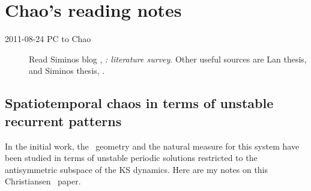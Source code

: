 \begin{description}
\end{description}

\section{Chao's reading notes}
\label{s:KSreading}

\begin{description}
\item[2011-08-24 PC to Chao]
Read Siminos blog , \emph{ \KS: literature survey}.
Other useful sources are Lan thesis,  and Siminos
thesis, .
\end{description}


\subsection{Spatiotemporal chaos in terms of unstable recurrent patterns}
\label{s:Christiansen97}

In the initial work, the \statesp\ geometry and the natural measure for
this system have been
studied in terms of unstable
periodic solutions restricted to the antisymmetric subspace of the
KS dynamics. Here are my notes on this Christiansen \etal\ paper.

